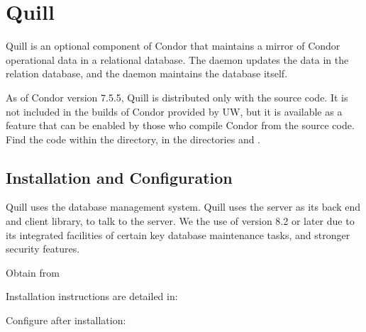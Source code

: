 \section{\label{sec:Quill}Quill}
Quill is an optional component of Condor that maintains a mirror 
of Condor operational data
in a relational database.  The  daemon updates
the data in the relation database, and the  daemon
maintains the database itself.

As of Condor version 7.5.5,
Quill is distributed only with the source code.
It is not included in the builds of Condor provided by UW,
but it is available as a feature that can be enabled by those who compile
Condor from the source code.
Find the code within the  directory, 
in the directories  and .

\subsection{\label{sec:Quill-Installation}Installation and Configuration}

Quill uses the  database management system.
Quill uses the  server as its back end
and client library, 
 to talk to the server.
We  the use of version 
8.2 or later due to its integrated facilities of certain key 
database maintenance tasks, and stronger security features.

Obtain  from


Installation instructions are detailed in:

Configure  after installation:

